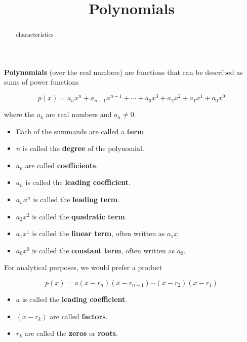 \documentclass{ximera}
\title{Polynomials}
\begin{document}
\begin{abstract}
characteristics
\end{abstract}
\maketitle




\begin{definition}
\textbf{Polynomials} (over the real numbers) are functions that can be described as sums of power functions


\[    p(x) = a_n x^n + a_{n-1} x^{n-1} + \cdots + a_3 x^3 + a_2 x^2 + a_1 x^1 + a_0 x^0      \]

where the $a_k$ are real numbers and $a_n \ne 0$.


\begin{itemize}
\item Each of the summands are called a \textbf{term}.  
\item $n$ is called the \textbf{degree} of the polynomial.
\item $a_k$ are called \textbf{coefficients}.
\item $a_n$ is called the \textbf{leading coefficient}.
\item $a_n x^n$ is called the \textbf{leading term}.
\item $a_2 x^2$ is called the \textbf{quadratic term}.
\item $a_1 x^1$ is called the \textbf{linear term}, often written as $a_1 x$.
\item $a_0 x^0$ is called the \textbf{constant term}, often written as $a_0$.

\end{itemize}

\end{definition}





For analytical purposes, we would prefer a product

\[   p(x) = a (x-r_n)(x-r_{n-1})  \cdots (x-r_2)(x-r_1)  \]


\begin{itemize}

\item $a$ is called the \textbf{leading coefficient}.
\item $(x-r_k)$ are called \textbf{factors}.
\item $r_k$ are called the \textbf{zeros} or \textbf{roots}.

\end{itemize}
\end{document}
